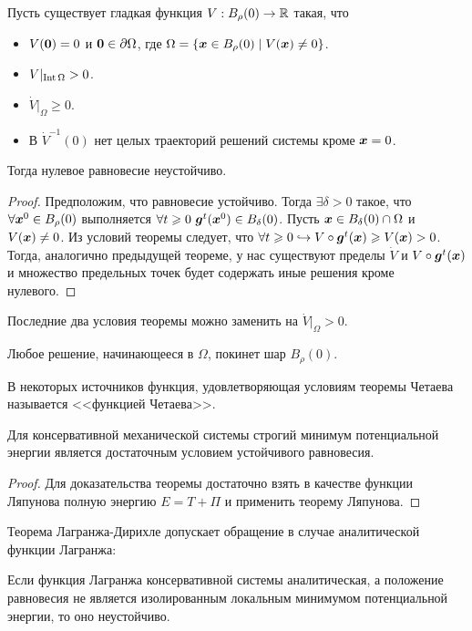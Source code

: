 \begin{theorem}
    Пусть существует гладкая функция $V: B_{\rho}(0) \to \mathbb{R}$ такая, что
    \begin{itemize}
        \item $V(\boldsymbol{0}) = 0$ и $\boldsymbol{0} \in \partial \Omega$, где $\Omega = \{\boldsymbol{x} \in B_{\rho}(0) \mid V(\boldsymbol{x}) \neq 0\}$.
        \item $V|_{\operatorname{Int} \Omega} > 0$.
        \item $\dot{V}|_{\Omega} \geq 0$.
        \item В $\dot{V}^{-1}(0)$ нет целых траекторий решений системы кроме $\boldsymbol{x} = 0$.
    \end{itemize}
    Тогда нулевое равновесие неустойчиво.
\end{theorem}
\begin{proof}
    Предположим, что равновесие устойчиво.
    Тогда $\exists \delta > 0$ такое, что $\forall \boldsymbol{x}^0 \in B_{\rho}(0)$ выполняется $\forall t \geqslant 0 \ \boldsymbol{g}^t(\boldsymbol{x}^0) \in B_{\delta}(0)$.
    Пусть $\boldsymbol{x} \in B_\delta(0) \cap \Omega$ и $V(\boldsymbol{x}) \neq 0$.
    Из условий теоремы следует, что $\forall t \geqslant 0 \hookrightarrow V \circ \boldsymbol{g}^t(\boldsymbol{x}) \geqslant V(\boldsymbol{x}) > 0$.
    Тогда, аналогично предыдущей теореме, у нас существуют пределы $\dot{V}$ и $V \circ \boldsymbol{g}^t(\boldsymbol{x})$ и множество предельных точек будет содержать иные решения кроме нулевого.
\end{proof}
\begin{note}
    Последние два условия теоремы можно заменить на $\dot{V}|_{\Omega} > 0$.
\end{note}
\begin{note}
    Любое решение, начинающееся в $\Omega$, покинет шар $B_\rho(0)$.
\end{note}
\begin{note}
    В некоторых источников функция, удовлетворяющая условиям теоремы Четаева называется <<функцией Четаева>>.
\end{note}
\begin{theorem}
    Для консервативной механической системы строгий минимум потенциальной энергии является достаточным условием устойчивого равновесия.
\end{theorem}
\begin{proof}
    Для доказательства теоремы достаточно взять в качестве функции Ляпунова полную энергию $E = T + \Pi$ и применить теорему Ляпунова.
\end{proof}
\begin{note}
    Теорема Лагранжа-Дирихле допускает обращение в случае аналитической функции Лагранжа:
    \begin{theorem}
        Если функция Лагранжа консервативной системы аналитическая, а положение равновесия не является изолированным локальным минимумом потенциальной энергии, то оно неустойчиво.
    \end{theorem}
\end{note}